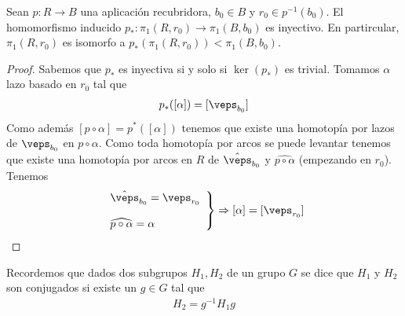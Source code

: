 \begin{teo}
    Sean $p:R \to B$ una aplicación recubridora, $b_0\in B$ y $r_0\in p^{-1}(b_0)$. El homomorfismo inducido $p_*:\pi_1(R,r_0)\to \pi_1(B,b_0)$ es inyectivo. En partircular, $\pi_1(R,r_0)$ es isomorfo a $p_*(\pi_1(R,r_0))< \pi_1(B,b_0)$.

    \begin{proof}
        Sabemos que $p_*$ es inyectiva si y solo si $\ker(p_*)$ es trivial. Tomamos $\alpha$ lazo basado en $r_0$ tal que 
        \begin{gather*}
            p_*([\alpha]) = [\veps_{b_0}]
        \end{gather*}
        Como además $[p\circ \alpha] = p^*([\alpha])$ tenemos que existe una homotopía por lazos de $\veps_{b_0}$ en $p\circ \alpha$. Como toda homotopía por arcos se puede levantar tenemos que existe una homotopía por arcos en $R$ de $\hat{\veps}_{b_0}$ y $\widehat{p\circ \alpha}$ (empezando en $r_0$). Tenemos
        \begin{gather*}
            \left.
            \begin{array}{l}
                \hat{\veps}_{b_0} = \veps_{r_0}\\\\
                \widehat{p\circ \alpha} = \alpha
            \end{array}
            \right\}  \Rightarrow [\alpha] = [\veps_{r_0}]
        \end{gather*}
    \end{proof}
\end{teo}

\begin{observacion}
    Recordemos que dados dos subgrupos $H_1,H_2$ de un grupo $G$ se dice que $H_1$ y $H_2$ son conjugados si existe un $g\in G$ tal que 
    \begin{gather*}
        H_2=g^{-1}H_1 g
    \end{gather*}
\end{observacion}

